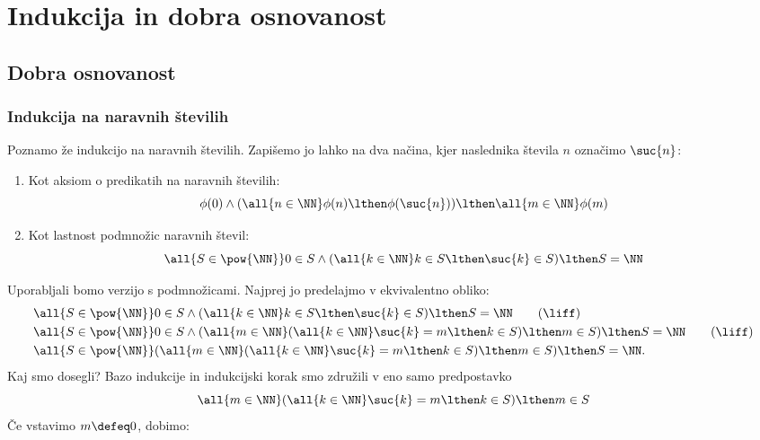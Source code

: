 \chapter{Indukcija in dobra osnovanost}

\section{Dobra osnovanost}

\subsection{Indukcija na naravnih številih}

Poznamo že indukcijo na naravnih številih. Zapišemo jo lahko na dva načina,
kjer naslednika števila $n$ označimo $\suc{n}$:
%
\begin{enumerate}
\item Kot aksiom o predikatih na naravnih številih:
  \begin{equation*}
  \phi(0) \land (\all{n \in \NN} \phi(n) \lthen \phi(\suc{n})) \lthen \all{m \in \NN} \phi(m)
  \end{equation*}

\item Kot lastnost podmnožic naravnih števil:
  \begin{equation*}
    \all{S \in \pow{\NN}} 0 \in S \land (\all{k \in \NN} k \in S \lthen \suc{k} \in S) \lthen S = \NN
  \end{equation*}
\end{enumerate}
%
Uporabljali bomo verzijo s podmnožicami. Najprej jo predelajmo v ekvivalentno obliko:
%
\begin{align}
  &\all{S \in \pow{\NN}} 0 \in S \land (\all{k \in \NN} k \in S \lthen \suc{k} \in S) \lthen S = \NN \tag{$\liff$} \\
  &\all{S \in \pow{\NN}} 0 \in S \land (\all{m \in \NN} (\all{k \in \NN} \suc{k} = m \lthen k \in S) \lthen m \in S) \lthen S = \NN \tag{$\liff$} \\
  &\all{S \in \pow{\NN}} (\all{m \in \NN} (\all{k \in \NN} \suc{k} = m \lthen k \in S) \lthen m \in S) \lthen S = \NN. \notag
\end{align}
%
Kaj smo dosegli? Bazo indukcije in indukcijski korak smo združili v eno samo predpostavko
%
\begin{equation}
  \label{eq:ind-N}
  \all{m \in \NN} (\all{k \in \NN} \suc{k} = m \lthen k \in S) \lthen m \in S
\end{equation}
%
Če vstavimo $m \defeq 0$, dobimo:
